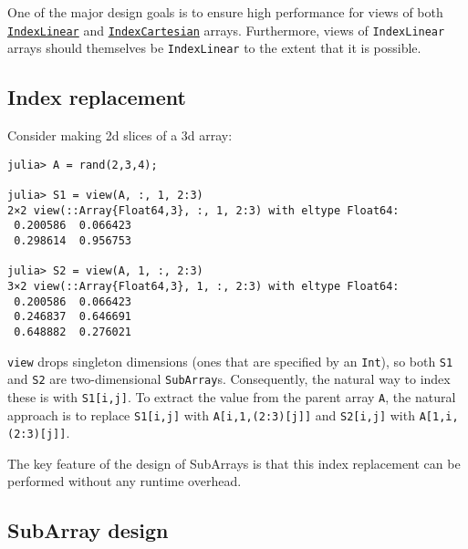 One of the major design goals is to ensure high performance for views of both \hyperlink{1761039776681330940}{\texttt{IndexLinear}} and \hyperlink{4052302263500310575}{\texttt{IndexCartesian}} arrays. Furthermore, views of \texttt{IndexLinear} arrays should themselves be \texttt{IndexLinear} to the extent that it is possible.



\hypertarget{5581126844733696350}{}


\subsection{Index replacement}



Consider making 2d slices of a 3d array:






\begin{verbatim}
julia> A = rand(2,3,4);

julia> S1 = view(A, :, 1, 2:3)
2×2 view(::Array{Float64,3}, :, 1, 2:3) with eltype Float64:
 0.200586  0.066423
 0.298614  0.956753

julia> S2 = view(A, 1, :, 2:3)
3×2 view(::Array{Float64,3}, 1, :, 2:3) with eltype Float64:
 0.200586  0.066423
 0.246837  0.646691
 0.648882  0.276021
\end{verbatim}





\texttt{view} drops {\textquotedbl}singleton{\textquotedbl} dimensions (ones that are specified by an \texttt{Int}), so both \texttt{S1} and \texttt{S2} are two-dimensional \texttt{SubArray}s. Consequently, the natural way to index these is with \texttt{S1[i,j]}. To extract the value from the parent array \texttt{A}, the natural approach is to replace \texttt{S1[i,j]} with \texttt{A[i,1,(2:3)[j]]} and \texttt{S2[i,j]} with \texttt{A[1,i,(2:3)[j]]}.



The key feature of the design of SubArrays is that this index replacement can be performed without any runtime overhead.



\hypertarget{2778530023624514912}{}


\subsection{SubArray design}



